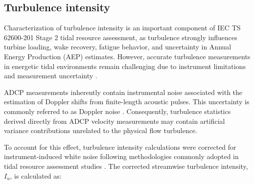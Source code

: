 \documentclass[12pt,sort&compress]{elsarticle}
\theoremstyle{definition}%
\begin{document}






\subsection{Turbulence intensity}
\label{subsec:2.4}

\noindent Characterization of turbulence intensity is an important component of IEC TS 62600-201 Stage 2 tidal resource assessment, as turbulence strongly influences turbine loading, wake recovery, fatigue behavior, and uncertainty in Annual Energy Production (AEP) estimates. However, accurate turbulence measurements in energetic tidal environments remain challenging due to instrument limitations and measurement uncertainty \cite{neill_tidal_2021}.

ADCP measurements inherently contain instrumental noise associated with the estimation of Doppler shifts from finite-length acoustic pulses. This uncertainty is commonly referred to as Doppler noise \cite{curm_1990}. Consequently, turbulence statistics derived directly from ADCP velocity measurements may contain artificial variance contributions unrelated to the physical flow turbulence.

To account for this effect, turbulence intensity calculations were corrected for instrument-induced white noise following methodologies commonly adopted in tidal resource assessment studies \cite{sellar_characterisation_2018}. The corrected streamwise turbulence intensity, \(I_u\), is calculated as:
\end{document}
